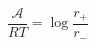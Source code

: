 \begin{equation}\label{eqn:reaction-affinity-ratio}
\frac{\mathcal A}{RT}= \log\frac{r_+}{r_-} 
\end{equation}